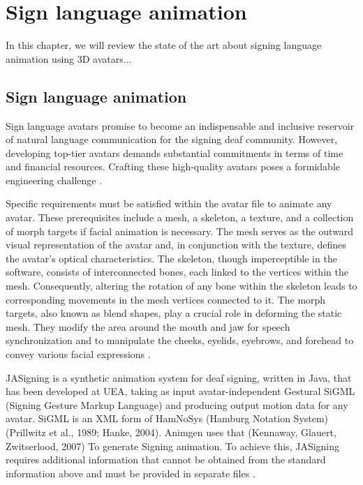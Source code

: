 \chapter{Sign language animation}

In this chapter, we will review the state of the art about signing language 
animation using 3D avatars...

\section{Sign language animation}

Sign language avatars promise to become an indispensable and inclusive reservoir of natural language communication for the signing deaf community. However, developing top-tier avatars demands substantial commitments in terms of time and financial resources. Crafting these high-quality avatars poses a formidable engineering challenge \cite{quandt2020teaching}.


Specific requirements must be satisfied within the avatar file to animate any avatar. These prerequisites include a mesh, a skeleton, a texture, and a collection of morph targets if facial animation is necessary. The mesh 
serves as the outward visual representation of the avatar and, in conjunction with 
the texture, defines the avatar's optical characteristics. The skeleton, though 
imperceptible in the software, consists of interconnected bones, each linked to the 
vertices within the mesh. Consequently, altering the rotation of any bone within 
the skeleton leads to corresponding movements in the mesh vertices connected to it. 
The morph targets, also known as blend shapes, play a crucial role in deforming the 
static mesh. They modify the area around the mouth and jaw for 
speech synchronization and to manipulate the cheeks, eyelids, eyebrows, and 
forehead to convey various facial expressions \cite{jennings2010requirements}.

JASigning is a synthetic animation system for deaf signing, written in Java, that 
has been developed at UEA, taking as input avatar-independent Gestural SiGML 
(Signing Gesture Markup Language) \parencite{elliott2004overview, 
elliott2008linguistic} and producing output motion data for any avatar. SiGML is an 
XML form of HamNoSys (Hamburg Notation System) (Prillwitz et al., 1989; Hanke, 
2004). Animgen uses that (Kennaway, Glauert, Zwitserlood, 2007) To generate 
Signing animation. To achieve this, JASigning requires additional information that 
cannot be obtained from the standard information above and must be provided in 
separate files \cite{jennings2010requirements}.

